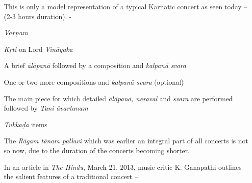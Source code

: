 This is only a model representation of a typical Karnatic concert as seen today – (2-3 hours duration). -

\textit{Varṇam}

\textit{Kṛti} on Lord \textit{Vināyaka}

A brief \textit{ālāpanā} followed by a composition and \textit{kalpanā svara}

One or two more compositions and \textit{kalpanā svara} (optional)

The main piece for which detailed \textit{ālāpanā, neraval} and \textit{svara} are performed followed by \textit{Tani āvartanam}

\textit{Tukkaḍa} items

The \textit{Rāgam tānam pallavi} which was earlier an integral part of all concerts is not so now, due to the duration of the concerts becoming shorter.

In an article in \textit{The Hindu}, March 21, 2013, music critic K. Ganapathi outlines the salient features of a traditional concert –

